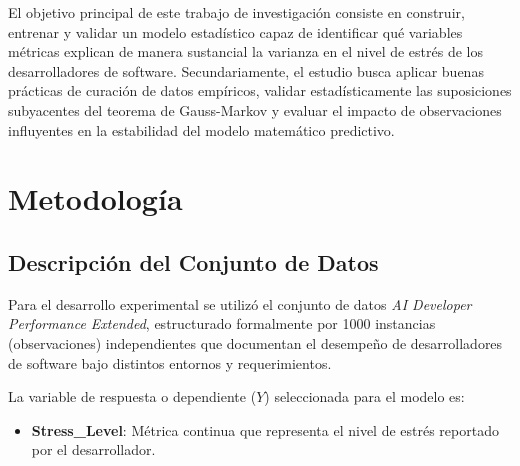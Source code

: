 \documentclass[conference]{IEEEtran}
\begin{document}
El objetivo principal de este trabajo de investigación consiste en construir, entrenar y validar un modelo estadístico capaz de identificar qué variables métricas explican de manera sustancial la varianza en el nivel de estrés de los desarrolladores de software. Secundariamente, el estudio busca aplicar buenas prácticas de curación de datos empíricos, validar estadísticamente las suposiciones subyacentes del teorema de Gauss-Markov y evaluar el impacto de observaciones influyentes en la estabilidad del modelo matemático predictivo.

\section{Metodología}

\subsection{Descripción del Conjunto de Datos}
Para el desarrollo experimental se utilizó el conjunto de datos \textit{AI Developer Performance Extended}, estructurado formalmente por 1000 instancias (observaciones) independientes que documentan el desempeño de desarrolladores de software bajo distintos entornos y requerimientos. 

La variable de respuesta o dependiente ($Y$) seleccionada para el modelo es:
\begin{itemize}
\item \textbf{Stress\_Level}: Métrica continua que representa el nivel de estrés reportado por el desarrollador.
\end{itemize}
\end{document}
